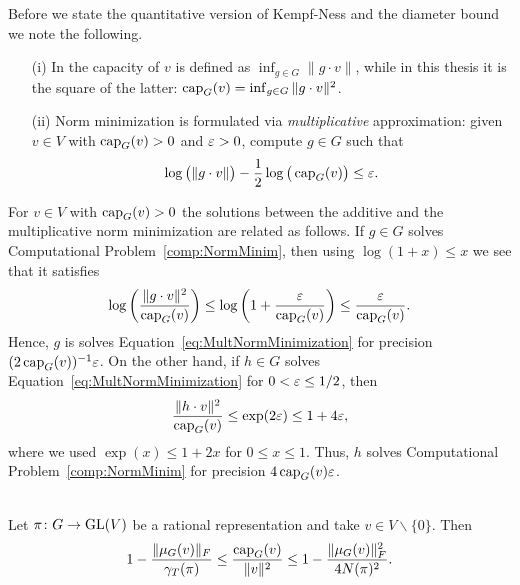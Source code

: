 \begin{remark}\label{rem:NormMinimAdditiveVsMultiplicative}
	Before we state the quantitative version of Kempf-Ness and the diameter bound we note the following.
	\begin{itemize}
		\item[(i)] In \cite{GradflowArXiv} the capacity of $v$ is defined as $\inf_{g \in G} \|g \cdot v \|$, while in this thesis it is the square of the latter: $\operatorname{cap}_G(v)  = \inf_{g \in G} \| g \cdot v \|^2$.
		
		\item[(ii)] Norm minimization \cite[Problem~1.10]{GradflowArXiv} is formulated via \emph{multiplicative} approximation: given $v \in V$ with $\operatorname{cap}_G(v) > 0$ and $\varepsilon > 0$, compute $g \in G$ such that
			\begin{equation}\label{eq:MultNormMinimization}
				\log \big( \|g \cdot v\| \big) - \frac{1}{2} \log \big( \operatorname{cap}_G(v) \big) \leq \varepsilon .
			\end{equation}
	\end{itemize}
	For $v \in V$ with $\operatorname{cap}_G(v) > 0$ the solutions between the additive and the multiplicative norm minimization are related as follows.
	If $g \in G$ solves Computational Problem~\ref{comp:NormMinim}, then using $\log(1+x) \leq x$ we see that it satisfies
		\[ \log \left( \frac{\|g \cdot v\|^2}{\operatorname{cap}_G(v)} \right) \leq \log \left( 1 + \frac{\varepsilon}{\operatorname{cap}_G(v)} \right) \leq \frac{\varepsilon}{\operatorname{cap}_G(v)} . \]
	Hence, $g$ is solves Equation~\eqref{eq:MultNormMinimization} for precision $(2\operatorname{cap}_G(v))^{-1} \varepsilon$.
	On the other hand, if $h \in G$ solves Equation~\eqref{eq:MultNormMinimization} for $0<\varepsilon \leq 1/2$, then
		\[ \frac{\|h \cdot v\|^2}{\operatorname{cap}_G(v)} \leq \exp(2 \varepsilon) \leq 1 + 4\varepsilon , \]
	where we used $\exp(x) \leq 1 + 2x$ for $0 \leq x \leq 1$. Thus, $h$ solves Computational Problem~\ref{comp:NormMinim} for precision $4 \operatorname{cap}_G(v) \varepsilon$. %
	\hfill\remSymbol
\end{remark}

\begin{theorem} \label{thm:NonCommutativeDuality} \ \\
	Let $\pi \colon G \to \operatorname{GL}(V)$ be a rational representation and take $v \in V \backslash \{0\}$. Then
		\begin{equation}\label{eq:NonCommutativeDuality}
			1 - \frac{\|\mu_G(v)\|_F}{\gamma_{T}(\pi)} \leq \frac{\operatorname{cap}_G(v)}{\|v\|^2} \leq 1 - \frac{\|\mu_G(v)\|_F^2}{4 N(\pi)^2} .
		\end{equation}
\end{theorem}

